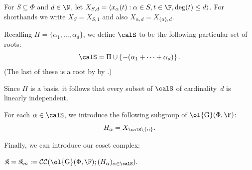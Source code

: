 \documentclass[11pt]{article}
\newcommand{\CC}[2]{\mathcal{C}\mathcal{C}(#1;#2)}
\newcommand{\Gu}[2]{\ol{\mathrm{G}}(#1,#2)}
\newcommand{\complex}{\mathfrak{K}}
\begin{document}
\begin{definition}
    For $S \subseteq \Phi$ and $d \in \N$, let $X_{S,d} = \langle x_\alpha(t) : \alpha \in S, t \in \F, \deg(t) \le d \rangle$. For shorthands we write $X_S = X_{S,1}$ and also $X_{\alpha,d} = X_{\{\alpha\},d}$.
\end{definition}

\begin{definition}\label{def:rootchoice}
    Recalling $\Pi = \{\alpha_1, \dots, \alpha_d\}$, we define  $\calS$ to be the following particular set of roots:
     \begin{equation}   \label{eqn:ourS}
        \calS = \Pi \cup \left\{-(\alpha_1 + \cdots + \alpha_d)\right\}.
     \end{equation}
     (The last of these is a root by by .)
\end{definition}

\begin{remark}  \label{rem:matr}
    Since $\Pi$ is a basis, it follows that every subset of $\calS$ of cardinality~$d$ is linearly independent.
\end{remark}

\begin{definition}
    For each $\alpha \in \calS$, we introduce the following subgroup of $\Gu{\Phi}{\F}$:
    \[
        H_\alpha= X_{\calS \setminus \{ \alpha\}}.
    \]
\end{definition}

Finally, we can introduce our coset complex:
\begin{definition}
    $\displaystyle \complex = \complex_m := \CC{\Gu{\Phi}{\F}}{(H_\alpha)_{\alpha \in \calS}}.$
\end{definition}
\end{document}
